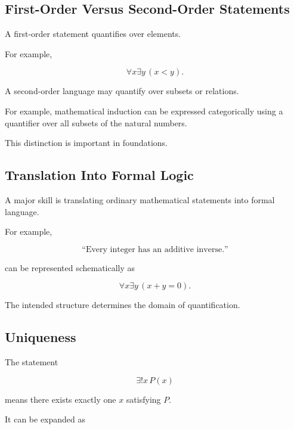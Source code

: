 \subsection{First-Order Versus Second-Order Statements}
\label{subsec:first-vs-second-order}

A first-order statement quantifies over elements.

For example,

\[
\boxed{
\forall x\exists y\,(x<y).
}
\]

A second-order language may quantify over subsets or relations.

For example, mathematical induction can be expressed categorically using a
quantifier over all subsets of the natural numbers.

This distinction is important in foundations.

\subsection{Translation Into Formal Logic}
\label{subsec:translation-formal-logic}

A major skill is translating ordinary mathematical statements into formal
language.

For example,

\[
\boxed{
\text{``Every integer has an additive inverse.''}
}
\]

can be represented schematically as

\[
\boxed{
\forall x
\exists y
\,
(x+y=0).
}
\]

The intended structure determines the domain of quantification.

\subsection{Uniqueness}
\label{subsec:formal-uniqueness}

The statement

\[
\exists!x\,P(x)
\]

means there exists exactly one \(x\) satisfying \(P\).

It can be expanded as

